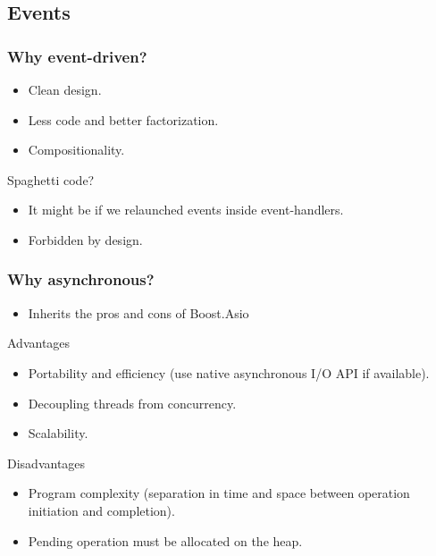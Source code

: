 \documentclass[xcolor=dvipsnames]{beamer}
\begin{document}
\subsection{Events}

\begin{frame}
\frametitle{Why event-driven?}

\begin{itemize}
  \item Clean design.
  \item Less code and better factorization.
  \item Compositionality.
\end{itemize}

\begin{block}{Spaghetti code?}
\begin{itemize}
  \item It might be if we relaunched events inside event-handlers.
  \item Forbidden by design.
\end{itemize}
\end{block}
\end{frame}

\begin{frame}
\frametitle{Why asynchronous?}

\begin{itemize}
\item Inherits the pros and cons of Boost.Asio
\end{itemize}

\begin{exampleblock}{Advantages}
\begin{itemize}
  \item Portability and efficiency (use native asynchronous I/O API if available).
  \item Decoupling threads from concurrency.
  \item Scalability.
\end{itemize}
\end{exampleblock}

\begin{alertblock}{Disadvantages}
\begin{itemize}
  \item Program complexity (separation in time and space between operation initiation and completion).
  \item Pending operation must be allocated on the heap.
\end{itemize}
\end{alertblock}

\end{frame}
\end{document}
